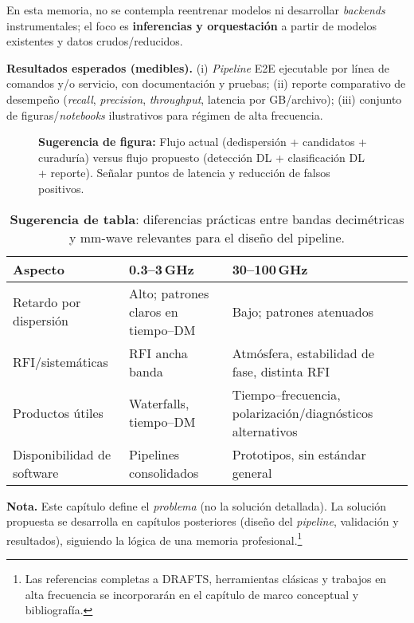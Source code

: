 \medskip
En esta memoria, no se contempla reentrenar modelos ni desarrollar \emph{backends} instrumentales; el foco es \textbf{inferencias y orquestación} a partir de modelos existentes y datos crudos/reducidos.

\medskip
\noindent\textbf{Resultados esperados (medibles).} (i) \emph{Pipeline} E2E ejecutable por línea de comandos y/o servicio, con documentación y pruebas; (ii) reporte comparativo de desempeño (\emph{recall}, \emph{precision}, \emph{throughput}, latencia por GB/archivo); (iii) conjunto de figuras/\emph{notebooks} ilustrativos para régimen de alta frecuencia.

\begin{figure}[h]
\centering
\caption{\textbf{Sugerencia de figura:} Flujo actual (dedispersión + candidatos + curaduría) versus flujo propuesto (detección DL + clasificación DL + reporte). Señalar puntos de latencia y reducción de falsos positivos.}
\end{figure}

\begin{table}[h]
\centering
\caption{\textbf{Sugerencia de tabla}: diferencias prácticas entre bandas decimétricas y mm-wave relevantes para el diseño del pipeline.}
\begin{tabular}{p{} p{} p{}}
\toprule
\textbf{Aspecto} & \textbf{0.3--3\,GHz} & \textbf{30--100\,GHz} \\
\midrule
Retardo por dispersión & Alto; patrones claros en tiempo--DM & Bajo; patrones atenuados \\
RFI/sistemáticas & RFI ancha banda & Atmósfera, estabilidad de fase, distinta RFI \\
Productos útiles & Waterfalls, tiempo--DM & Tiempo--frecuencia, polarización/diagnósticos alternativos \\
Disponibilidad de software & Pipelines consolidados & Prototipos, sin estándar general \\
\bottomrule
\end{tabular}
\end{table}

\medskip
\noindent\textbf{Nota.} Este capítulo define el \emph{problema} (no la solución detallada). La solución propuesta se desarrolla en capítulos posteriores (diseño del \emph{pipeline}, validación y resultados), siguiendo la lógica de una memoria profesional.\footnote{Las referencias completas a DRAFTS, herramientas clásicas y trabajos en alta frecuencia se incorporarán en el capítulo de marco conceptual y bibliografía.}